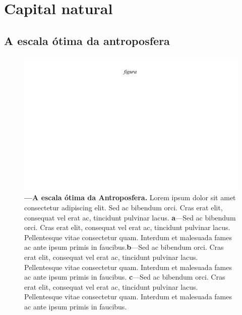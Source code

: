 \documentclass[./main.tex]{subfiles}
\begin{document}
\section{Capital natural} \label{chap:ecoeco:natcap}

\subsection{A escala ótima da antroposfera} \label{subsec:escaleopt}

\begin{figure}[t!] 
\centering				
\includegraphics[width=0.98\linewidth]{figs/fig_m.jpg}		
\caption[A escala ótima da Antroposfera]
{\textbf{---\;A escala ótima da Antroposfera.}
    Lorem ipsum dolor sit amet consectetur adipiscing elit. Sed ac bibendum orci. Cras erat elit, consequat vel erat ac, tincidunt pulvinar lacus. \;\textbf{a}\;---\;Sed ac bibendum orci. Cras erat elit, consequat vel erat ac, tincidunt pulvinar lacus. Pellentesque vitae consectetur quam. Interdum et malesuada fames ac ante ipsum primis in faucibus.\;\textbf{b}\;---\;Sed ac bibendum orci. Cras erat elit, consequat vel erat ac, tincidunt pulvinar lacus. Pellentesque vitae consectetur quam. Interdum et malesuada fames ac ante ipsum primis in faucibus. \;\textbf{c}\;---\;Sed ac bibendum orci. Cras erat elit, consequat vel erat ac, tincidunt pulvinar lacus. Pellentesque vitae consectetur quam. Interdum et malesuada fames ac ante ipsum primis in faucibus.
}
\label{fig:eco:escaleopt} 		
\end{figure}
\end{document}
